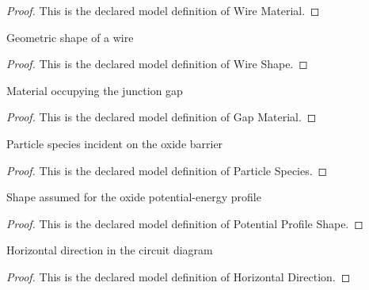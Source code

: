 \begin{proof}
  This is the declared model definition of Wire Material.
\end{proof}
\begin{definition}
  \label{def:physics:phyx-mini-0616:phyxminiproblems-problemphyxmini0616-wireshape}
  Geometric shape of a wire
\end{definition}
\begin{proof}
  This is the declared model definition of Wire Shape.
\end{proof}
\begin{definition}
  \label{def:physics:phyx-mini-0616:phyxminiproblems-problemphyxmini0616-gapmaterial}
  Material occupying the junction gap
\end{definition}
\begin{proof}
  This is the declared model definition of Gap Material.
\end{proof}
\begin{definition}
  \label{def:physics:phyx-mini-0616:phyxminiproblems-problemphyxmini0616-particlespecies}
  Particle species incident on the oxide barrier
\end{definition}
\begin{proof}
  This is the declared model definition of Particle Species.
\end{proof}
\begin{definition}
  \label{def:physics:phyx-mini-0616:phyxminiproblems-problemphyxmini0616-potentialprofileshape}
  Shape assumed for the oxide potential-energy profile
\end{definition}
\begin{proof}
  This is the declared model definition of Potential Profile Shape.
\end{proof}
\begin{definition}
  \label{def:physics:phyx-mini-0616:phyxminiproblems-problemphyxmini0616-horizontaldirection}
  Horizontal direction in the circuit diagram
\end{definition}
\begin{proof}
  This is the declared model definition of Horizontal Direction.
\end{proof}
